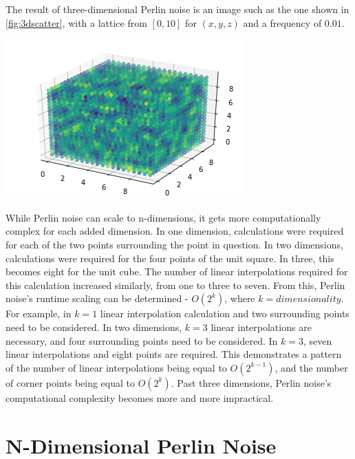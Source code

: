 \documentclass[10pt]{report}
\begin{document}
			The result of three-dimensional Perlin noise is an image such as the one shown in \autoref{fig:3dscatter}, with a lattice from \([0,10]\) for \((x,y,z)\) and a frequency of \(0.01\). 
			
			\begin{minipage}{\textwidth}
				\centering
				\includegraphics[scale=0.5]{3dperlinscatter}
				\label{fig:3dscatter}
			\end{minipage}
			
			While Perlin noise can scale to n-dimensions, it gets more computationally complex for each added dimension. In one dimension, calculations were required for each of the two points surrounding the point in question. In two dimensions, calculations were required for the four points of the unit square. In three, this becomes eight for the unit cube. The number of linear interpolations required for this calculation increased similarly, from one to three to seven. From this, Perlin noise's runtime scaling can be determined - \(O(2^k)\), where \(k = dimensionality\). For example, in \(k=1\) linear interpolation calculation and two surrounding points need to be considered. In two dimensions, \(k=3\) linear interpolations are necessary, and four surrounding points need to be considered. In \(k=3\), seven linear interpolations and eight points are required. This demonstrates a pattern of the number of linear interpolations being equal to \(O(2^{k-1})\), and the number of corner points being equal to \(O(2^k)\). Past three dimensions, Perlin noise's computational complexity becomes more and more impractical.
			
		\section{N-Dimensional Perlin Noise} \label{sec:n-dim}
			
\end{document}
